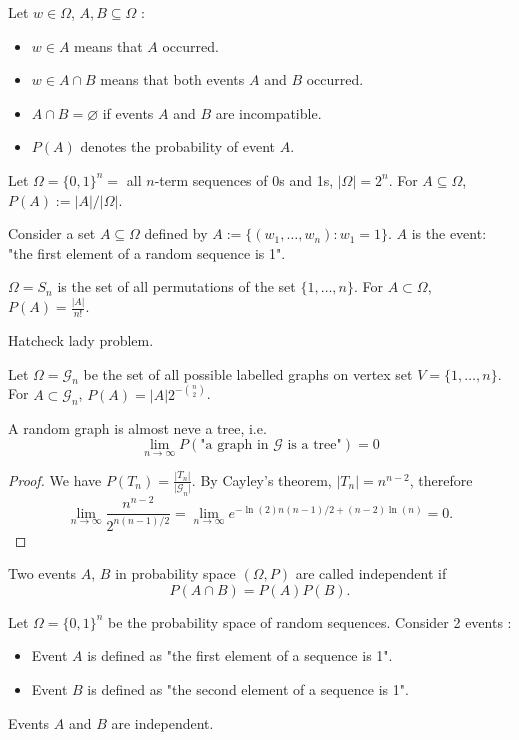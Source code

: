 Let $w\in \Omega$, $A,B\subseteq \Omega$ : 
\begin{itemize}
\item $w\in A$ means that $A$ occurred.
\item $w\in A\cap B$ means that both events $A$ and $B$ occurred.
\item $A\cap B=\varnothing$ if events $A$ and $B$ are incompatible.
\item $P(A)$ denotes the probability of event $A$.
\end{itemize}
\begin{example}
Let $\Omega=\{ 0,1 \}^{n}=$ all $n$-term sequences of 0s and 1s, $|\Omega|=2^{n}$. For $A\subseteq \Omega$, $P(A):=|A|/|\Omega|$.

Consider a set $A\subseteq \Omega$ defined by $A:=\{ (w_{1},\dots,w_{n}):w_{1}=1 \}$. $A$ is the event: "the first element of a random sequence is 1".
\end{example}
\begin{example}
$\Omega=S_{n}$ is the set of all permutations of the set $\{ 1,\dots,n \}$. For $A\subset \Omega$, $P(A)=\frac{|A|}{n!}$.
\begin{reminder}
Hatcheck lady problem.
\end{reminder}
\end{example}
\begin{example}
Let $\Omega=\mathcal{G}_{n}$ be the set of all possible labelled graphs on vertex set $V=\{ 1,\dots,n \}$. For $A\subset \mathcal{G}_{n}$, $P(A)=|A|2^{-\binom{ n}  {2}}$.
\end{example}
\begin{proposition}
A random graph is almost neve a tree, i.e.
$$
\lim_{ n \to \infty } P(\text{"a graph in }\mathcal{G}\text{ is a tree"})=0
$$
\end{proposition}
\begin{proof}
We have $P(T_{n})=\frac{|T_{n}|}{\mathcal{|G}_{n}|}$. By Cayley's theorem, $|T_{n}|=n^{n-2}$, therefore 
$$
\lim_{ n \to \infty } \frac{n^{n-2}}{2^{n(n-1)/2}}=\lim_{ n \to \infty } e^{-\ln(2) n(n-1)/2+(n-2)\ln(n)}=0.
$$
\end{proof}
\begin{definition}
Two events $A$, $B$ in probability space $(\Omega ,P)$ are called independent if 
$$
P(A\cap B)=P(A)P(B).
$$
\end{definition}
\begin{example}
Let $\Omega=\{ 0,1 \}^{n}$ be the probability space of random sequences. Consider 2 events :
\begin{itemize}
\item Event $A$ is defined as "the first element of a sequence is 1".
\item Event $B$ is defined as "the second element of a sequence is 1".
\end{itemize}
Events $A$ and $B$ are independent.
\end{example}

